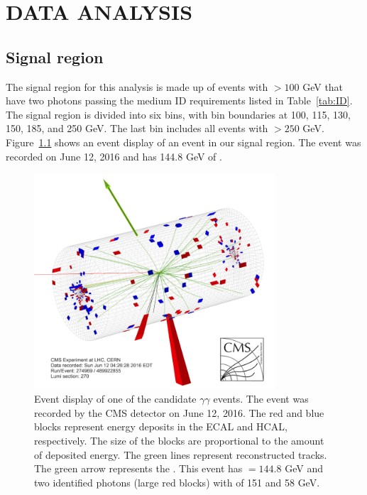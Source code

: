 \chapter{DATA ANALYSIS}
\label{chap:DataAnalysis}

\section{Signal region}
The signal region for this analysis is made up of events with \ETmiss $> 100$ GeV that have two photons passing the medium ID requirements listed in Table~\ref{tab:ID}. The signal region is divided into six \ETmiss bins, with bin boundaries at 100, 115, 130, 150, 185, and 250 GeV. The last bin includes all events with \ETmiss $> 250$ GeV. Figure~\ref{fig:eventDisplay} shows an event display of an event in our signal region. The event was recorded on June 12, 2016 and has 144.8 GeV of \ETmiss.

\begin{figure}[h]
\begin{center}
\includegraphics[width=0.8\textwidth]{Figures/DataAnalysis/eventDisplay.png}
\end{center}
\caption[Event display of one of the candidate $\gamma\gamma$ events.]{Event display of one of the candidate $\gamma\gamma$ events. The event was recorded by the CMS detector on June 12, 2016. The red and blue blocks represent energy deposits in the ECAL and HCAL, respectively. The size of the blocks are proportional to the amount of deposited energy. The green lines represent reconstructed tracks. The green arrow represents the \ETmiss. This event has \ETmiss $ = 144.8$ GeV and two identified photons (large red blocks) with \pT of 151 and 58 GeV. }
\label{fig:eventDisplay}
\end{figure}


